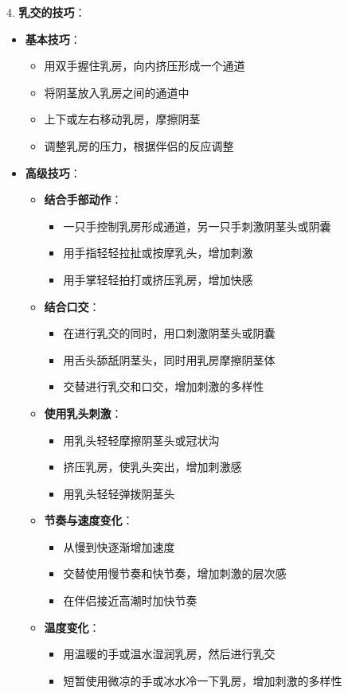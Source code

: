 \documentclass[12pt,UTF8]{ctexbook}
\begin{document}
4. \textbf{乳交的技巧}：
\begin{itemize}
	\item \textbf{基本技巧}：
	\begin{itemize}
		\item 用双手握住乳房，向内挤压形成一个通道
		\item 将阴茎放入乳房之间的通道中
		\item 上下或左右移动乳房，摩擦阴茎
		\item 调整乳房的压力，根据伴侣的反应调整
	\end{itemize}
	\item \textbf{高级技巧}：
	\begin{itemize}
		\item \textbf{结合手部动作}：
		\begin{itemize}
			\item 一只手控制乳房形成通道，另一只手刺激阴茎头或阴囊
			\item 用手指轻轻拉扯或按摩乳头，增加刺激
			\item 用手掌轻轻拍打或挤压乳房，增加快感
		\end{itemize}
		\item \textbf{结合口交}：
		\begin{itemize}
			\item 在进行乳交的同时，用口刺激阴茎头或阴囊
			\item 用舌头舔舐阴茎头，同时用乳房摩擦阴茎体
			\item 交替进行乳交和口交，增加刺激的多样性
		\end{itemize}
		\item \textbf{使用乳头刺激}：
		\begin{itemize}
			\item 用乳头轻轻摩擦阴茎头或冠状沟
			\item 挤压乳房，使乳头突出，增加刺激感
			\item 用乳头轻轻弹拨阴茎头
		\end{itemize}
		\item \textbf{节奏与速度变化}：
		\begin{itemize}
			\item 从慢到快逐渐增加速度
			\item 交替使用慢节奏和快节奏，增加刺激的层次感
			\item 在伴侣接近高潮时加快节奏
		\end{itemize}
		\item \textbf{温度变化}：
		\begin{itemize}
			\item 用温暖的手或温水湿润乳房，然后进行乳交
			\item 短暂使用微凉的手或冰水冷一下乳房，增加刺激的多样性
		\end{itemize}
	\end{itemize}
\end{itemize}
\end{document}
